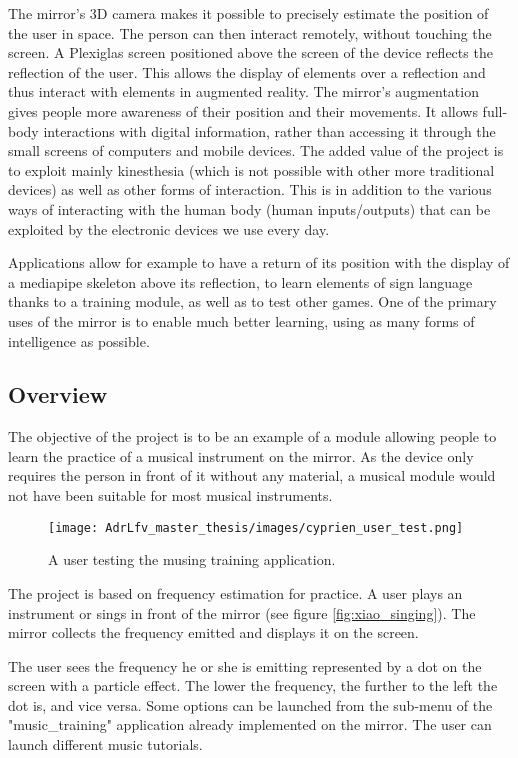 The mirror’s 3D camera makes it possible to precisely estimate the position of the user in  space. The person can then interact remotely, without touching the screen. A Plexiglas screen positioned above the screen of the device reflects the reflection of the user. This allows the display of elements over a reflection and thus interact with elements in augmented reality. The mirror’s augmentation gives people more awareness of their position and their movements. It allows full-body interactions with digital information, rather than accessing it through the small screens of computers and mobile devices. The added value of the project is to exploit mainly kinesthesia (which is not possible with other more traditional devices) as well as other forms of interaction. This is in addition to the various ways of interacting with the human body (human inputs/outputs) that can be exploited by the electronic devices we use every day.

Applications allow for example to have a return of its position with the display of a mediapipe skeleton above its reflection, to learn elements of sign language thanks to a training module, as well as to test other games. One of the primary uses of the mirror is to enable much better learning, using as many forms of intelligence as possible.

\subsection{Overview}

The objective of the project is to be an example of a module allowing people to learn the practice of a musical instrument on the mirror. As the device only requires the person in front of it without any material, a musical module would not have been suitable for most musical instruments.

\begin{figure}[h]
    \centering
    \texttt{[image: AdrLfv\_master\_thesis/images/cyprien\_user\_test.png]}
    \caption{A user testing the musing training application.}
    \label{fig:cyprien_user_test.png}
\end{figure}

The project is based on frequency estimation for practice. A user plays an instrument or sings in front of the mirror (see figure \ref{fig:xiao_singing}). The mirror collects the frequency emitted and displays it on the screen.

The user sees the frequency he or she is emitting represented by a dot on the screen with a particle effect. The lower the frequency, the further to the left the dot is, and vice versa. Some options can be launched from the sub-menu of the "music\_training" application already
implemented on the mirror. The user can launch different music tutorials.

